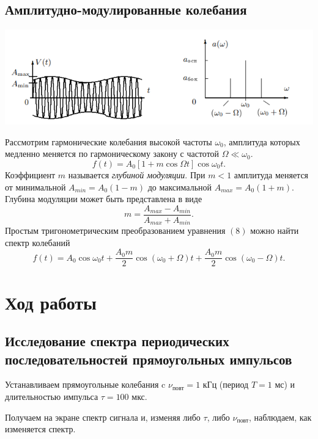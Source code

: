 \subsection*{Амплитудно-модулированные колебания}
    \begin{center}
    \includegraphics[scale=0.9]{images/4.png}
    \end{center}
Рассмотрим гармонические колебания высокой частоты $\omega_0$, амплитуда которых медленно меняется по гармоническому закону с частотой $\Omega \ll \omega_0$.
    \begin{equation}
    f(t) = A_0 \left[1+m\cos \Omega t\right] \cos \omega_0 t.
    \end{equation}
Коэффициент $m$ называется \textit{глубиной модуляции}. При $m < 1$ амплитуда меняется от минимальной $A_{min} = A_0(1-m)$ до максимальной $A_{max} = A_0(1+m)$. Глубина модуляции может быть представлена в виде
    \begin{equation}
    m = \dfrac{A_{max}-A_{min}}{A_{max}+A_{min}}.
    \end{equation}
Простым тригонометрическим преобразованием уравнения $(8)$ можно найти спектр колебаний
    \begin{equation}
    f(t) = A_0 \cos \omega_0t + \dfrac{A_0m}{2} \cos \left(\omega_0 + \Omega\right)t + \dfrac{A_0m}{2}\cos\left(\omega_0 - \Omega\right)t.
    \end{equation}

\section{Ход работы}
\subsection*{Исследование спектра периодических последовательностей прямоугольных импульсов}
Устанавливаем прямоугольные колебания c $\nu_{\text{повт}} = 1$ кГц (период $T = 1$ мс) и длительностью импульса $\tau = 100$ мкс.

Получаем на экране спектр сигнала и, изменяя либо $\tau$, либо $\nu_{\text{повт}}$, наблюдаем, как изменяется спектр.

